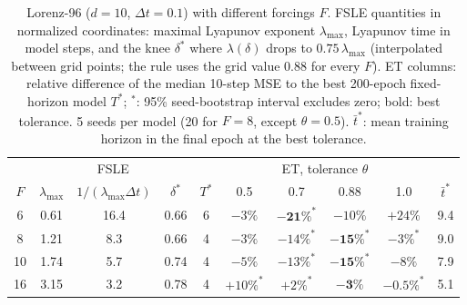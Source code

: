 \begin{table}[htbp]
  \centering
  \caption{Lorenz-96 ($d = 10$, $\Delta t = 0.1$) with different forcings $F$. FSLE quantities in normalized coordinates: maximal Lyapunov exponent $\lambda_{\max}$, Lyapunov time in model steps, and the knee $\delta^*$ where $\lambda(\delta)$ drops to $0.75\,\lambda_{\max}$ (interpolated between grid points; the rule uses the grid value $0.88$ for every $F$). ET columns: relative difference of the median 10-step MSE to the best 200-epoch fixed-horizon model $T^*$; $^{*}$: 95\% seed-bootstrap interval excludes zero; bold: best tolerance. 5 seeds per model (20 for $F = 8$, except $\theta = 0.5$). $\bar t^*$: mean training horizon in the final epoch at the best tolerance.}
  \label{tab:et-forcing}
  \small
  \begin{tabular}{c ccc c cccc c}
    \toprule
    & \multicolumn{3}{c}{FSLE} & & \multicolumn{4}{c}{ET, tolerance $\theta$} & \\
    \cmidrule(lr){2-4}\cmidrule(lr){6-9}
    $F$ & $\lambda_{\max}$ & $1/(\lambda_{\max}\Delta t)$ & $\delta^*$ & $T^*$ & 0.5 & 0.7 & 0.88 & 1.0 & $\bar t^*$ \\
    \midrule
    6  & 0.61 & 16.4 & 0.66 & 6 & $-3\%$ & $\mathbf{-21\%}^{*}$ & $-10\%$ & $+24\%$ & 9.4 \\
    8  & 1.21 & 8.3  & 0.66 & 4 & $-3\%$ & $-14\%^{*}$ & $\mathbf{-15\%}^{*}$ & $-3\%^{*}$ & 9.0 \\
    10 & 1.74 & 5.7  & 0.74 & 4 & $-5\%$ & $-13\%^{*}$ & $\mathbf{-15\%}^{*}$ & $-8\%$ & 7.9 \\
    16 & 3.15 & 3.2  & 0.78 & 4 & $+10\%^{*}$ & $+2\%^{*}$ & $\mathbf{-3\%}$ & $-0.5\%^{*}$ & 5.1 \\
    \bottomrule
  \end{tabular}
\end{table}
